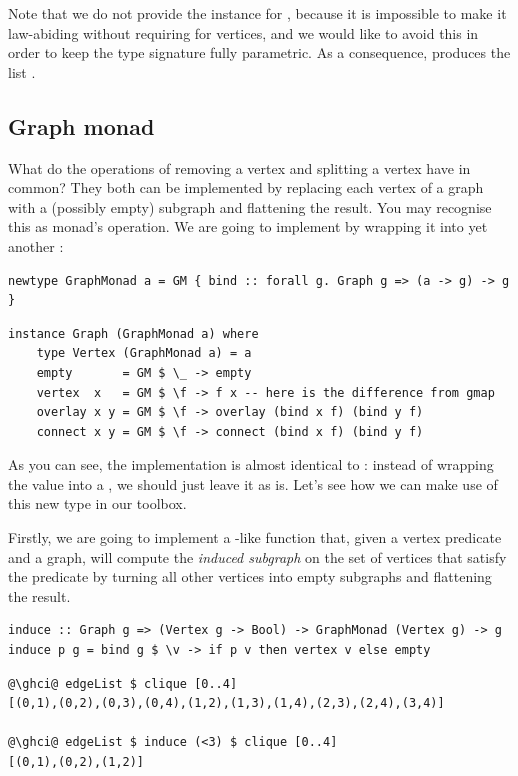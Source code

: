 \noindent
Note that we do not provide the  instance for , because it
is impossible to make it law-abiding without requiring  for vertices,
and we would like to avoid this in order to keep the  type signature
fully parametric. As a consequence,  produces the
list \hs{[1,1]}.

\subsection{Graph monad}\label{sub-monad}

What do the operations of removing a vertex and splitting a vertex have in common?
They both can be implemented by replacing each vertex of a graph with a (possibly empty)
subgraph and flattening the result. You may recognise this as monad's
 operation. We are going to implement 
by wrapping it into yet another :

\begin{verbatim}
newtype GraphMonad a = GM { bind :: forall g. Graph g => (a -> g) -> g }
\end{verbatim}
\vspace{1mm}
\begin{verbatim}
instance Graph (GraphMonad a) where
    type Vertex (GraphMonad a) = a
    empty       = GM $ \_ -> empty
    vertex  x   = GM $ \f -> f x -- here is the difference from gmap
    overlay x y = GM $ \f -> overlay (bind x f) (bind y f)
    connect x y = GM $ \f -> connect (bind x f) (bind y f)
\end{verbatim}

As you can see, the implementation is almost identical to : instead of
wrapping the value  into a , we should just leave it as is.
Let's see how we can make use of this new type in our toolbox.

Firstly, we are going to implement a -like function 
that, given a vertex predicate and a graph, will compute the \emph{induced subgraph}
on the set of vertices that satisfy the predicate by turning all other
vertices into empty subgraphs and flattening the result.

\begin{verbatim}
induce :: Graph g => (Vertex g -> Bool) -> GraphMonad (Vertex g) -> g
induce p g = bind g $ \v -> if p v then vertex v else empty
\end{verbatim}
\vspace{1mm}
\begin{verbatim}
@\ghci@ edgeList $ clique [0..4]
[(0,1),(0,2),(0,3),(0,4),(1,2),(1,3),(1,4),(2,3),(2,4),(3,4)]

@\ghci@ edgeList $ induce (<3) $ clique [0..4]
[(0,1),(0,2),(1,2)]
\end{verbatim}

